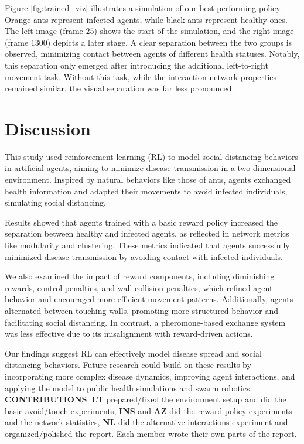 \documentclass[9pt]{IEEEtran}
\begin{document}
Figure \ref{fig:trained_viz} illustrates a simulation of our best-performing policy. Orange ants represent infected agents, while black ants represent healthy ones. The left image (frame $25$) shows the start of the simulation, and the right image (frame $1300$) depicts a later stage. A clear separation between the two groups is observed, minimizing contact between agents of different health statuses. Notably, this separation only emerged after introducing the additional left-to-right movement task. Without this task, while the interaction network properties remained similar, the visual separation was far less pronounced.

\section{Discussion}

This study used reinforcement learning (RL) to model social distancing behaviors in artificial agents, aiming to minimize disease transmission in a two-dimensional environment. Inspired by natural behaviors like those of ants, agents exchanged health information and adapted their movements to avoid infected individuals, simulating social distancing.

Results showed that agents trained with a basic reward policy increased the separation between healthy and infected agents, as reflected in network metrics like modularity and clustering. These metrics indicated that agents successfully minimized disease transmission by avoiding contact with infected individuals.

We also examined the impact of reward components, including diminishing rewards, control penalties, and wall collision penalties, which refined agent behavior and encouraged more efficient movement patterns. Additionally, agents alternated between touching walls, promoting more structured behavior and facilitating social distancing. In contrast, a pheromone-based exchange system was less effective due to its misalignment with reward-driven actions.

Our findings suggest RL can effectively model disease spread and social distancing behaviors. Future research could build on these results by incorporating more complex disease dynamics, improving agent interactions, and applying the model to public health simulations and swarm robotics.
\\

\small\noindent\textbf{CONTRIBUTIONS}: \textbf{LT} prepared/fixed the environment setup and did the basic avoid/touch experiments, \textbf{INS} and \textbf{AZ} did the reward policy experiments and the network statistics, \textbf{NL} did the alternative interactions experiment and organized/polished the report. Each member wrote their own parts of the report.

\printbibliography
\end{document}
